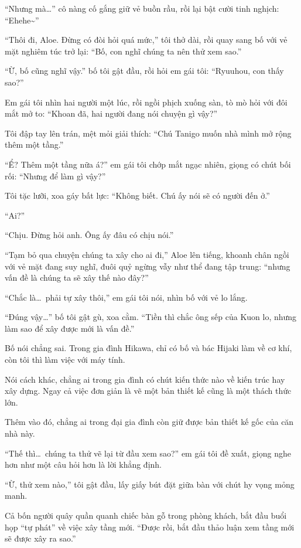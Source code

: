\documentclass[../main.tex]{subfiles}
\begin{document}
``Nhưng mà\dots'' cô nàng cố gắng giữ vẻ buồn rầu, rồi lại bật cười tinh nghịch: ``Ehehe\~{}''

``Thôi đi, Aloe. Đừng có đòi hỏi quá mức,'' tôi thở dài, rồi quay sang bố với vẻ mặt nghiêm túc trở lại: ``Bố, con nghĩ chúng ta nên thử xem sao.''

``Ừ, bố cũng nghĩ vậy.'' bố tôi gật đầu, rồi hỏi em gái tôi: ``Ryuuhou, con thấy sao?''

Em gái tôi nhìn hai người một lúc, rồi ngồi phịch xuống sàn, tò mò hỏi với đôi mắt mở to: ``Khoan đã, hai người đang nói chuyện gì vậy?''

Tôi đập tay lên trán, mệt mỏi giải thích: ``Chú Tanigo muốn nhà mình mở rộng thêm một tầng.''

``Ể? Thêm một tầng nữa á?'' em gái tôi chớp mắt ngạc nhiên, giọng có chút bối rối: ``Nhưng để làm gì vậy?''

Tôi tặc lưỡi, xoa gáy bất lực: ``Không biết. Chú ấy nói sẽ có người đến ở.''

``Ai?''

``Chịu. Đừng hỏi anh. Ông ấy đâu có chịu nói.''

``Tạm bỏ qua chuyện chúng ta xây cho ai đi,'' Aloe lên tiếng, khoanh chân ngồi với vẻ mặt đang suy nghĩ, đuôi quỷ ngừng vẫy như thể đang tập trung: ``nhưng vấn đề là chúng ta sẽ xây thế nào đây?''

``Chắc là\dots\ phải tự xây thôi,'' em gái tôi nói, nhìn bố với vẻ lo lắng.

``Đúng vậy\dots'' bố tôi gật gù, xoa cằm. ``Tiền thì chắc ông sếp của Kuon lo, nhưng làm sao để xây được mới là vấn đề.''

Bố nói chẳng sai. Trong gia đình Hikawa, chỉ có bố và bác Hijaki làm về cơ khí, còn tôi thì làm việc với máy tính.

Nói cách khác, chẳng ai trong gia đình có chút kiến thức nào về kiến trúc hay xây dựng. Ngay cả việc đơn giản là vẽ một bản thiết kế cũng là một thách thức lớn.

Thêm vào đó, chẳng ai trong đại gia đình còn giữ được bản thiết kế gốc của căn nhà này.

``Thế thì\dots\ chúng ta thử vẽ lại từ đầu xem sao?'' em gái tôi đề xuất, giọng nghe hơn như một câu hỏi hơn là lời khẳng định.

``Ừ, thử xem nào,'' tôi gật đầu, lấy giấy bút đặt giữa bàn với chút hy vọng mỏng manh.

Cả bốn người quây quần quanh chiếc bàn gỗ trong phòng khách, bắt đầu buổi họp ``tự phát'' về việc xây tầng mới. ``Được rồi, bắt đầu thảo luận xem tầng mới sẽ được xây ra sao.''
\end{document}

